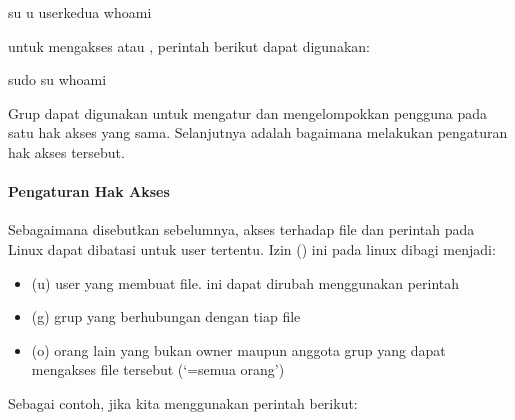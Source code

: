 \documentclass[letterpaper,10pt,english]{sphinxmanual}
\begin{document}
\begin{enumerate}
\begin{sphinxVerbatim}[commandchars=\\\{\}]
su \textendash{}u userkedua
whoami
\end{sphinxVerbatim}

untuk mengakses  atau , perintah berikut dapat digunakan:

\begin{sphinxVerbatim}[commandchars=\\\{\}]
sudo su
whoami
\end{sphinxVerbatim}

\end{enumerate}

Grup dapat digunakan untuk mengatur dan mengelompokkan pengguna pada satu hak akses yang sama. Selanjutnya adalah bagaimana melakukan pengaturan hak akses tersebut.


\paragraph{Pengaturan Hak Akses}
\label{\detokenize{sesi1/arsitektur:pengaturan-hak-akses}}
Sebagaimana disebutkan sebelumnya, akses terhadap file dan perintah pada Linux dapat dibatasi untuk user tertentu. Izin () ini pada linux dibagi menjadi:
\begin{itemize}
\item {} 
 (u) \sphinxhyphen{} user yang membuat file. ini dapat dirubah menggunakan perintah 

\item {} 
 (g) \sphinxhyphen{} grup yang berhubungan dengan tiap file

\item {} 
 (o) \sphinxhyphen{} orang lain yang bukan owner maupun anggota grup yang dapat mengakses file tersebut (‘=semua orang’)

\end{itemize}

Sebagai contoh, jika kita menggunakan perintah  berikut:

\end{document}

